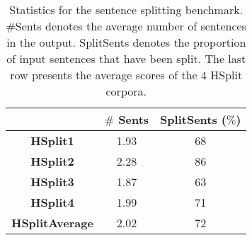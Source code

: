 \documentclass[11pt,a4paper]{article}
\begin{document}
\begin{center}
\begin{table}[h]
\scriptsize
\begin{center}
\begin{tabular}{|c|c|c|}
\hline
& {\bf $\#$ Sents} & {\bf SplitSents ($\%$)}\\
\hline
{\bf HSplit1} & 1.93 & 68\\
\hline
{\bf HSplit2 } & 2.28&  86\\
\hline  
{\bf HSplit3} & 1.87& 63\\
\hline
{\bf HSplit4} & 1.99& 71\\
\hline
{\bf HSplitAverage} &2.02  & 72\\
\hline    
\end{tabular}
\end{center}
\hfill
\caption{\small\label{tab:corpus_stats}Statistics for the sentence splitting benchmark. $\#$Sents denotes the average number of sentences in the output. SplitSents denotes the proportion of input sentences that have been split. %
The last row presents the average scores of the 4 HSplit corpora.}
\label{tab:split_effect}
\end{table}
\end{center}

 
\end{document}

